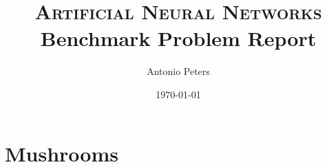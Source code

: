 \documentclass{article}%
\title{
\textsc{Artificial Neural Networks} \\ [25pt]
\huge Benchmark Problem Report \\ %
}
\author{Antonio Peters} %
\date{\today} %
\begin{document}
\maketitle %
\section{Mushrooms}

\end{document}

